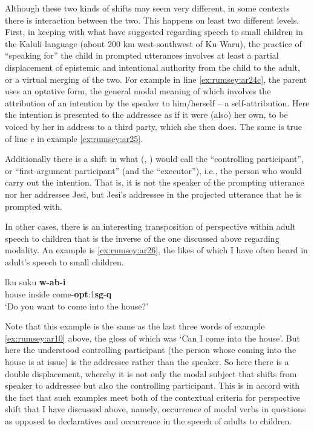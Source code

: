 \documentclass[output=paper]{langsci/langscibook}
\begin{document}
Although these two kinds of shifts may seem very different, in some contexts there is interaction between the two. This happens on least two different levels. First, in keeping with what \cite[451]{SanRoqueSchieffelin2018} have suggested regarding speech to small children in the Kaluli language (about 200 km west-southwest of Ku Waru), the practice of  “speaking for” the child in prompted utterances involves at least a partial displacement of epistemic and intentional authority from the child to the adult, or a virtual merging of the two. For example in line \ref{ex:rumsey:ar24c}, the parent uses an optative form, the general modal meaning of which involves the attribution of an intention by the speaker to him/herself – a self-attribution. Here the intention is presented to the addressee as if it were (also) her own, to be voiced by her in address to a third party, which she then does. The same is true of line c in example \ref{ex:rumsey:ar25}.  

Additionally there is a shift in what \citeauthor{Nuyts2005} (\citeyear{Nuyts2005}, \citeyear{Nuyts2006}) would call the “controlling participant”, or “first-argument participant” (and \citealt{Lehmann2012} the “executor”), i.e., the person who would carry out the intention. That is, it is not the speaker of the prompting utterance nor her addressee Jesi, but Jesi’s addressee in the projected utterance that he is prompted with.

In other cases, there is an interesting transposition of perspective within adult speech to children that is the inverse of the one discussed above regarding modality. An example is \ref{ex:rumsey:ar26}, the likes of which I have often heard in adult’s speech to small children.

\begin{exe}
	\ex \label{ex:rumsey:ar26}
	\gll lku suku \textbf{w-ab-i}\\
	house inside come-\textbf{opt}:1\textbf{sg}-\textbf{q}\\
	\trans ‘Do you want to come into the house?’
\end{exe}

Note that this example is the same as the last three words of example \ref{ex:rumsey:ar10} above, the gloss of which was ‘Can I come into the house’.  But here the understood controlling participant (the person whose coming into the house is at issue) is the addressee rather than the speaker. So here there is a double displacement, whereby it is not only the modal subject that shifts from speaker to addressee but also the controlling participant. This is in accord with the fact that such examples meet both of the contextual criteria for perspective shift that I have discussed above, namely, occurrence of modal verbs in questions as opposed to declaratives and occurrence in the speech of adults to children.
\end{document}
